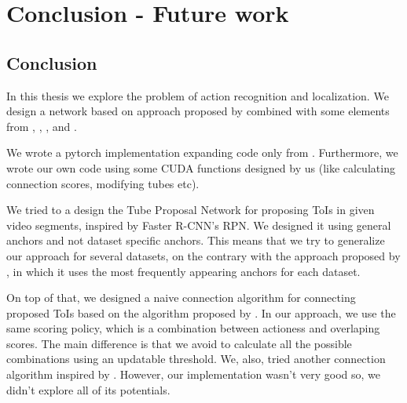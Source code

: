 


% 

\chapter{Conclusion - Future work}

\section{Conclusion}
In this thesis we explore the problem of action recognition and localization. We design a network based on approach proposed by \cite{DBLP:journals/corr/HouCS17}
combined with some elements from \cite{DBLP:journals/corr/abs-1712-09184}, \cite{Ren:2015:FRT:2969239.2969250}, \cite{Girshick:2015:FR:2919332.2920125},
\cite{DBLP:journals/corr/abs-1903-00304} and \cite{hara3dcnns}. \par

We wrote a pytorch implementation expanding code only from \cite{jjfaster2rcnn}. Furthermore, we wrote our own code using some CUDA functions designed by us (like
calculating connection scores, modifying tubes etc). \par

We tried to  a design the  Tube Proposal Network for proposing ToIs in given video segments, inspired by Faster R-CNN's RPN.
We designed it using general anchors and not dataset specific anchors. This means that we try to generalize our approach for several datasets, on the contrary with
the approach proposed by \cite{DBLP:journals/corr/abs-1712-09184}, in which it uses the most frequently appearing anchors for each dataset.

On top of that, we designed a naive connection algorithm for connecting  proposed ToIs based on the algorithm proposed by \cite{DBLP:journals/corr/abs-1712-09184}.
In our approach, we use the same scoring policy, which is a combination between actioness and overlaping scores. The main difference is that we avoid to calculate
all the possible combinations using an updatable threshold. We, also, tried another connection algorithm inspired by \cite{DBLP:journals/corr/abs-1903-00304}. However,
our implementation wasn't very good so, we didn't explore all of its potentials. \par

